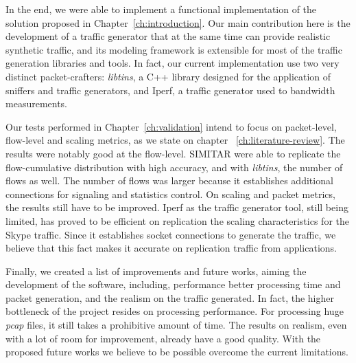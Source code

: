 In the end, we were able to implement a functional implementation of the solution proposed in Chapter~\ref{ch:introduction}. Our main contribution here is the development of a traffic generator that at the same time can provide realistic synthetic traffic, and its modeling framework is extensible for most of the traffic generation libraries and tools. In fact, our current implementation use two very distinct packet-crafters: \textit{libtins}, a C++ library designed for the application of sniffers and traffic generators, and Iperf, a traffic generator used to  bandwidth measurements. 


Our tests performed in Chapter~\ref{ch:validation} intend to focus on packet-level, flow-level and scaling metrics, as we state on chapter ~\ref{ch:literature-review}. The results were notably good at the flow-level. SIMITAR were able to replicate the flow-cumulative distribution with high accuracy, and with \textit{libtins}, the number of flows as well. The number of flows was larger because it establishes additional connections for signaling and statistics control. On scaling and packet metrics, the results still have to be improved. Iperf as the traffic generator tool, still being limited, has proved to be efficient on replication the scaling characteristics for the Skype traffic. Since it establishes socket connections to generate the traffic, we believe that this fact makes it accurate on replication traffic from applications. 


Finally, we created a list of improvements and future works, aiming the development of the software, including, performance better processing time and packet generation, and the realism on the traffic generated. In fact, the higher bottleneck of the project resides on processing performance. For processing huge \textit{pcap} files, it still takes a prohibitive amount of time. The results on realism, even with a lot of room for improvement, already have a good quality. With the proposed future works we believe to be possible overcome the current limitations.


